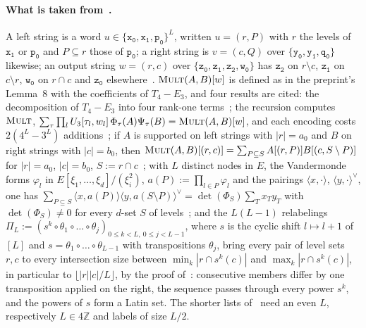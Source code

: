 \documentclass[11pt]{article}
\theoremstyle{definition}
\theoremstyle{remark}
\newcommand{\Z}{\mathbb{Z}}
\newcommand{\Mult}{\textnormal{\textsc{Mult}}}
\newcommand{\tl}[1]{\mathtt{#1}}
\newcommand{\pairL}[2]{\langle #1,#2\rangle}
\newcommand{\pairR}[2]{\langle #1,#2\rangle^{\vee}}
\begin{document}
\paragraph{What is taken from~\cite{Maj26b}.} A left string is a word $u\in\{\tl{x_0},\tl{x_1},\tl{p_0}\}^L$, written $u=(r,P)$ with $r$ the levels of $\tl{x_1}$ or $\tl{p_0}$ and $P\subseteq r$ those of $\tl{p_0}$; a right string is $v=(c,Q)$ over $\{\tl{y_0},\tl{y_1},\tl{q_0}\}$ likewise; an output string $w=(r,c)$ over $\{\tl{z_0},\tl{z_1},\tl{z_2},\tl{w_0}\}$ has $\tl{z_2}$ on $r\setminus c$, $\tl{z_1}$ on $c\setminus r$, $\tl{w_0}$ on $r\cap c$ and $\tl{z_0}$ elsewhere~\cite[Section~2]{Maj26b}. $\Mult(A,B)[w]$ is defined as in the preprint's Lemma~8 with the coefficients of $T_4-E_3$, and four results are cited: the decomposition of $T_4-E_3$ into four rank-one terms~\cite[Lemma~2.1]{Maj26b}; the recursion computes $\Mult$, $\sum_\tau\prod_lU_3[\tau_l,w_l]\,\Phi_\tau(A)\Psi_\tau(B)=\Mult(A,B)[w]$, and each encoding costs $2(4^L-3^L)$ additions~\cite[Lemma~2.3]{Maj26b}; if $A$ is supported on left strings with $|r|=a_0$ and $B$ on right strings with $|c|=b_0$, then $\Mult(A,B)[(r,c)]=\sum_{P\subseteq S}A[(r,P)]B[(c,S\setminus P)]$ for $|r|=a_0$, $|c|=b_0$, $S:=r\cap c$~\cite[Lemma~3.1]{Maj26b}; with $L$ distinct nodes in $E$, the Vandermonde forms $\varphi_l$ in $E[\xi_1,\dots,\xi_d]/(\xi_i^2)$, $a(P):=\prod_{l\in P}\varphi_l$ and the pairings $\pairL x{\cdot}$, $\pairR y{\cdot}$, one has $\sum_{P\subseteq S}\pairL x{a(P)}\pairR y{a(S\setminus P)}=\det(\Phi_S)\sum_Tx_Ty_T$ with $\det(\Phi_S)\ne0$ for every $d$-set $S$ of levels~\cite[Proposition~3.2]{Maj26b}; and the $L(L-1)$ relabelings $\Pi_L:=(s^k\circ\theta_1\circ\dots\circ\theta_j)_{0\le k<L,\ 0\le j<L-1}$, where $s$ is the cyclic shift $l\mapsto l+1$ of $[L]$ and $s=\theta_1\circ\dots\circ\theta_{L-1}$ with transpositions $\theta_j$, bring every pair of level sets $r,c$ to every intersection size between $\min_k|r\cap s^k(c)|$ and $\max_k|r\cap s^k(c)|$, in particular to $\lfloor|r||c|/L\rfloor$, by the proof of~\cite[Lemma~3.3]{Maj26b}: consecutive members differ by one transposition applied on the right, the sequence passes through every power $s^k$, and the powers of $s$ form a Latin set. The shorter lists of~\cite[Lemmas~3.3 and~3.4]{Maj26b} need an even $L$, respectively $L\in4\Z$ and labels of size $L/2$.
\end{document}
